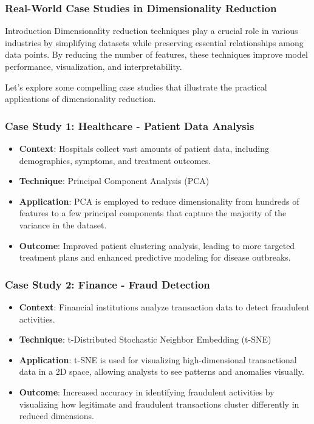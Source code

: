 \documentclass[aspectratio=169]{beamer}
\begin{document}
\begin{frame}[fragile]
    \frametitle{Real-World Case Studies in Dimensionality Reduction}
    \begin{block}{Introduction}
        Dimensionality reduction techniques play a crucial role in various industries by simplifying datasets while preserving essential relationships among data points. By reducing the number of features, these techniques improve model performance, visualization, and interpretability.
    \end{block}
    Let’s explore some compelling case studies that illustrate the practical applications of dimensionality reduction.
\end{frame}

\begin{frame}[fragile]
    \frametitle{Case Study 1: Healthcare - Patient Data Analysis}
    \begin{itemize}
        \item \textbf{Context}: Hospitals collect vast amounts of patient data, including demographics, symptoms, and treatment outcomes.
        \item \textbf{Technique}: Principal Component Analysis (PCA)
        \item \textbf{Application}: PCA is employed to reduce dimensionality from hundreds of features to a few principal components that capture the majority of the variance in the dataset.
        \item \textbf{Outcome}: Improved patient clustering analysis, leading to more targeted treatment plans and enhanced predictive modeling for disease outbreaks.
    \end{itemize}
\end{frame}

\begin{frame}[fragile]
    \frametitle{Case Study 2: Finance - Fraud Detection}
    \begin{itemize}
        \item \textbf{Context}: Financial institutions analyze transaction data to detect fraudulent activities.
        \item \textbf{Technique}: t-Distributed Stochastic Neighbor Embedding (t-SNE)
        \item \textbf{Application}: t-SNE is used for visualizing high-dimensional transactional data in a 2D space, allowing analysts to see patterns and anomalies visually.
        \item \textbf{Outcome}: Increased accuracy in identifying fraudulent activities by visualizing how legitimate and fraudulent transactions cluster differently in reduced dimensions.
    \end{itemize}
\end{frame}
\end{document}
